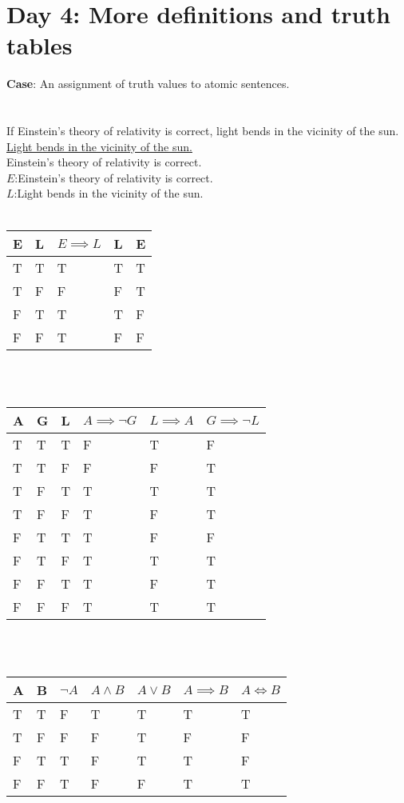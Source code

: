 \documentclass{article}
\begin{document}
	\section{Day 4: More definitions and truth tables}
	\textbf{Case}: An assignment of truth values to atomic sentences.\\
	\\
	\\If Einstein's theory of relativity is correct, light bends in the vicinity of the sun.
	\\\underline{Light bends in the vicinity of the sun.}
	\\Einstein's theory of relativity is correct.
	\\
	$E$:Einstein's theory of relativity is correct.\\
	$L$:Light bends in the vicinity of the sun.\\
	\\
	\begin{tabular}{l | l || l | l || l}
		E & L & $E \implies L$ & L & E\\ \hline
		T & T & T & T & T\\
		T & F & F & F & T\\
		F & T & T & T & F\\
		F & F & T & F & F\\
	\end{tabular}\\
	\\
	\begin{tabular}{l | l | l || l | l || l}
		A & G & L & $A \implies \lnot G$ & $L \implies A$ & $G \implies \lnot L$\\ \hline
		T & T & T & F & T & F\\
		T & T & F & F & F & T\\
		T & F & T & T & T & T\\
		T & F & F & T & F & T\\
		F & T & T & T & F & F\\
		F & T & F & T & T & T\\
		F & F & T & T & F & T\\
		F & F & F & T & T & T\\
	\end{tabular}\\
	\\
	\begin{tabular}{l | l || l | l | l | l | l}
		A & B & $\lnot A$ & $A \land B$ & $A \lor B$ & $A \implies B$ & $A \iff B$\\ \hline
		T & T & F & T & T & T & T\\
		T & F & F & F & T & F & F\\
		F & T & T & F & T & T & F\\
		F & F & T & F & F & T & T\\
	\end{tabular}\\
	\\
\end{document}
